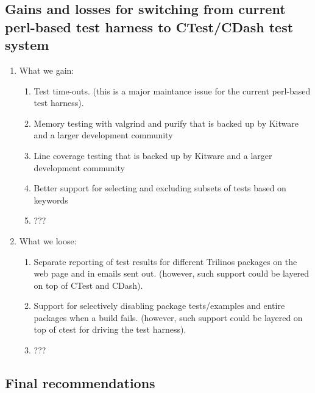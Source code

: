 \documentclass[pdf,ps2pdf,11pt]{SANDreport}
\begin{document}
%
\subsection{Gains and losses for switching from current perl-based test
harness to CTest/CDash test system}
%

\begin{enumerate}

{}\item What we gain:

  \begin{enumerate}

  {}\item Test time-outs. (this is a major maintance issue for the
  current perl-based test harness).

  {}\item Memory testing with valgrind and purify that is backed up by
  Kitware and a larger development community

  {}\item Line coverage testing that is backed up by Kitware and a larger
  development community

  {}\item Better support for selecting and excluding subsets of tests
  based on keywords

  {}\item ???

  \end{enumerate}

{}\item What we loose:

  \begin{enumerate}

  {}\item Separate reporting of test results for different Trilinos
  packages on the web page and in emails sent out. (however, such
  support could be layered on top of CTest and CDash).

  {}\item Support for selectively disabling package tests/examples and
  entire packages when a build fails.  (however, such support could be
  layered on top of ctest for driving the test harness).

  {}\item ???

  \end{enumerate}

\end{enumerate}


%
\subsection{Final recommendations}
%
\end{document}
